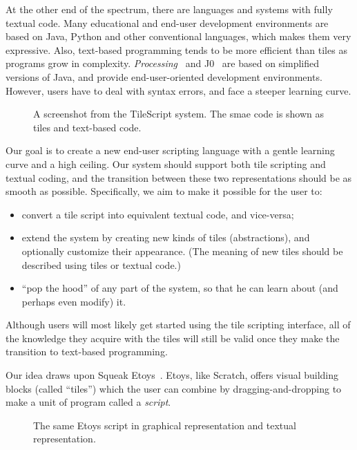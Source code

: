   At the other end of the spectrum, there are languages and systems
with fully textual code.  Many educational and end-user development
environments are based on Java, Python and other conventional
languages, which makes them very expressive.  Also, text-based
programming tends to be more efficient than tiles as programs grow in complexity.
{\em Processing}~\cite{rf07processing} and J0~\cite{j0} are based on
simplified versions of Java, and provide end-user-oriented
development environments.  However, users have to deal with syntax
errors, and face a steeper learning curve.

\begin{figure}[tp]
\centering
{}
\caption{A screenshot from the TileScript system.  The smae code is shown as tiles and text-based code.}
\label{fig:turtles}
\end{figure}

  Our goal is to create a new end-user scripting language with a gentle learning
curve and a high ceiling.  Our system should support both tile scripting and
textual coding, and the transition between these two representations should be as
smooth as possible.  Specifically, we aim to make it possible for the user to:
\begin{itemize}
\item
  convert a tile script into equivalent textual code, and vice-versa;
\item
  extend the system by creating new kinds of tiles (abstractions), and optionally customize
  their appearance. (The meaning of new tiles should be described using
  tiles or textual code.)
\item
  ``pop the hood'' of any part of the system, so that he can learn about (and perhaps even modify) it.
\end{itemize}
Although users will most likely get started using the tile scripting interface, all
of the
knowledge they acquire with the tiles will still be valid
once they make the transition to text-based programming.

  Our idea draws upon Squeak
Etoys~\cite{ack97Etoys}\cite{bjkr03PowerfulIdeas}.  Etoys, like Scratch,
offers visual building blocks (called ``tiles'') which the user can
combine by dragging-and-dropping to make a unit of program called
a {\em script}.

\begin{figure}[tp]
\centering
{}
\caption{The same Etoys script in graphical representation and textual representation.}
\label{fig:etoys tiles}
\end{figure}


